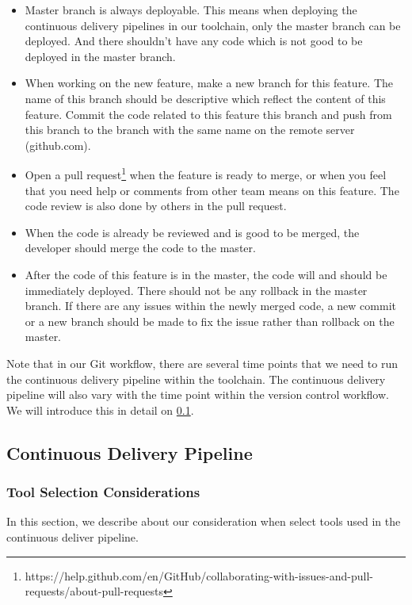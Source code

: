 \begin{itemize}
    \item Master branch is always deployable. This means when deploying the continuous delivery pipelines in our toolchain, only the master branch can be deployed. And there shouldn't have any code which is not good to be deployed in the master branch. 
    \item When working on the new feature, make a new branch for this feature. The name of this branch should be descriptive which reflect the content of this feature. Commit the code related to this feature this branch and push from this branch to the branch with the same name on the remote server (github.com).
    \item Open a pull request\footnote{https://help.github.com/en/GitHub/collaborating-with-issues-and-pull-requests/about-pull-requests} when the feature is ready to merge, or when you feel that you need help or comments from other team means on this feature. The code review is also done by others in the pull request.
    \item When the code is already be reviewed and is good to be merged, the developer should merge the code to the master.
    \item After the code of this feature is in the master, the code will and should be immediately deployed. There should not be any rollback in the master branch. If there are any issues within the newly merged code, a new commit or a new branch should be made to fix the issue rather than rollback on the master.
\end{itemize}
\par
Note that in our Git workflow, there are several time points that we need to run the continuous delivery pipeline within the toolchain. The continuous delivery pipeline will also vary with the time point within the version control workflow. We will introduce this in detail on \ref{our-ci}.
\subsection{Continuous Delivery Pipeline}
\label{our-ci}
\subsubsection{Tool Selection Considerations}
In this section, we describe about our consideration when select tools used in the continuous deliver pipeline.
